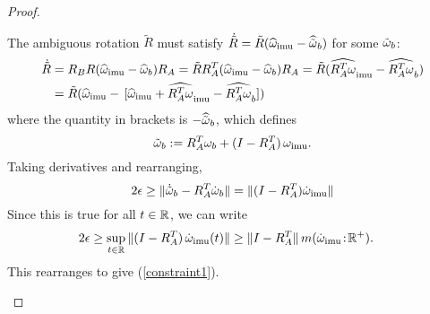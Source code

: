 \begin{proof}
\begin{description}
 \item
 \item[(\ref{constraint1})] The ambiguous rotation  $\tilde R$ must satisfy $\dot{\tilde R} = \tilde R({\widehat{\omega}}_\mathrm{imu} - \widehat{\tilde{\omega}}_b)$ for some $\tilde{\omega}_b$:
\begin{align*}
\dot{\tilde R} &= R_B R ({\widehat{\omega}}_\mathrm{imu}  - {\widehat{\omega}}_b) R_A 
= \tilde R R_A^T({\widehat{\omega}}_\mathrm{imu}  - {\widehat{\omega}}_b) R_A = \tilde R (\widehat{R_A^T \omega}_\mathrm{imu} - \widehat{R_A^T \omega}_{b})\\
&= \tilde R ({\widehat{\omega}}_\mathrm{imu}  - \,[{\widehat{\omega}}_\mathrm{imu}  + \widehat{R_A^T \omega}_\mathrm{imu} - \widehat{R_A^T \omega}_{b}]) \nonumber
\end{align*}
where the quantity in brackets is $-\widehat{\tilde{\omega}}_b$, which defines
\begin{equation}
 \tilde{\omega}_{b} := R_A^T\omega_b + (I - R_A^T)\,\omega_\mathrm{imu}. \label{rotdef}
\end{equation}
Taking derivatives and rearranging, 
$$
2\epsilon\geq \|\dot{\tilde{\omega}}_b-R_A^T\dot{\omega}_b\| = \|(I-R_A^T)\dot{\omega}_\mathrm{imu}\|
$$
Since this is true for all $t\in\mathbb{R}$, we can write
\begin{align*}
2\epsilon&\geq \sup_{t\in\mathbb{R}}\|(I-R_A^T)\,\dot{\omega}_\mathrm{imu}(t)\|
\geq \|I-R_A^T\|\,{m}(\dot{\omega}_\mathrm{imu}\!:\!\mathbb{R}^+).
\end{align*}
This rearranges to give (\ref{constraint1}).


\end{description}
\end{proof}
